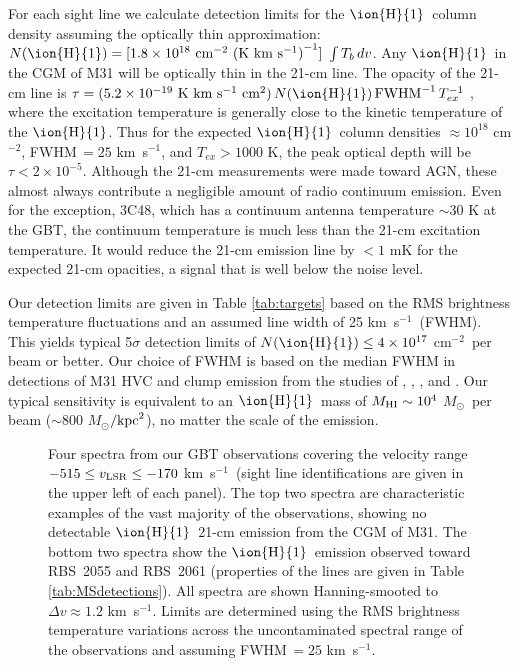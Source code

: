 \documentclass[12pt,preprint]{aastex6}
\newcommand{\HI}{\ensuremath{\mbox{\ion{H}{1}}}}
\newcommand{\NHI}{\ensuremath{N(\mbox{\ion{H}{1}})}\relax}
\newcommand{\msun}{\ensuremath{M_\odot}\relax}
\newcommand{\column}{cm$^{-2}$}
\newcommand{\kms}{km~s$^{-1}$}
\newcommand{\vlsr}{\ensuremath{v_{\rm LSR}\relax}}
\begin{document}
For each sight line we calculate detection limits for the \HI\ column
density assuming the optically thin approximation:
$\NHI = [1.8 \times 10^{18} \ \mbox{\column\ (K \kms)}^{-1}] \ \int T_b
\, dv$. Any \HI\ in the CGM of M31 will be optically thin in the 21-cm
line.  The opacity of the 21-cm line is
$\tau = (5.2 \times 10^{-19} \ \mbox{K \kms\ cm$^2$}) \, \NHI \, {\rm
  FWHM}^{-1} \, T_{ex}^{-1}$ \citep{dickey1990}, where the excitation
temperature is generally close to the kinetic temperature of the \HI.
Thus for the expected \HI\ column densities $\approx 10^{18}$ \column,
FWHM$\, = 25$ \kms, and $T_{ex} > 1000$ K, the peak optical depth will
be $\tau < 2 \times 10^{-5}$.  Although the 21-cm measurements were
made toward AGN, these almost always contribute a negligible amount of
radio continuum emission.  Even for the exception, 3C48, which has a
continuum antenna temperature $\sim30$ K at the GBT, the continuum
temperature is much less than the 21-cm excitation temperature.  It
would reduce the 21-cm emission line by $<1$ mK for the expected 21-cm
opacities, a signal that is well below the noise level.

Our detection limits are given in Table \ref{tab:targets} based on the
RMS brightness temperature fluctuations and an assumed line width of
25 \kms\ (FWHM). This yields typical 5$\sigma$ detection limits of
$\NHI \le 4\times10^{17}$ \column\ per beam or better. Our choice of
FWHM is based on the median FWHM in detections of M31 HVC and clump
emission from the studies of \cite{thilker2004},
\citet{westmeier2008}, \citet{lockman2012}, and \citet{wolfe2016}.
Our typical sensitivity is equivalent to an \HI\ mass of
$M_{\rm HI} \sim 10^4$ \msun\ per beam ($\sim 800$
\msun$/{\rm kpc}^2$), no matter the scale of the emission.

\begin{figure}
\caption{Four spectra from our GBT observations covering the velocity
  range $-515 \le \vlsr \le -170$ \kms\ (sight line identifications
  are given in the upper left of each panel). The top two spectra are
  characteristic examples of the vast majority of the observations,
  showing no detectable \HI\ 21-cm emission from the CGM of M31. The
  bottom two spectra show the \HI\ emission observed toward RBS~2055
  and RBS~2061 (properties of the lines are given in Table
  \ref{tab:MSdetections}). All spectra are shown Hanning-smooted to
  $\Delta v\approx1.2$ \kms. Limits are determined using the RMS
  brightness temperature variations across the uncontaminated spectral
  range of the observations and assuming FWHM$\, = 25$
  \kms.  \label{fig:spectra}}
\end{figure}
\end{document}

